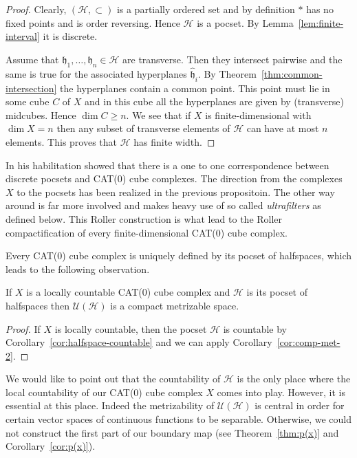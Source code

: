 \begin{proof}
  Clearly, \((\mathcal{H}, \subset)\) is a partially ordered set and by definition \(\ast\) has no fixed points and is order reversing. Hence \(\mathcal{H}\) is a pocset. By Lemma~\ref{lem:finite-interval} it is discrete.

  Assume that \(\mathfrak{h}_1, \dots, \mathfrak{h}_n \in \mathcal{H}\) are transverse. Then they intersect pairwise and the same is true for the associated hyperplanes \(\mathfrak{\hat h}_i\). By Theorem~\ref{thm:common-intersection} the hyperplanes contain a common point. This point must lie in some cube \(C\) of \(X\) and in this cube all the hyperplanes are given by (transverse) midcubes. Hence \(\dim C \geq n\). We see that if \(X\) is finite-dimensional with \(\dim X = n\) then any subset of transverse elements of \(\mathcal{H}\) can have at most \(n\) elements. This proves that \(\mathcal{H}\) has finite width.
\end{proof}

\begin{rem}
  \label{rem:roller}
  In his habilitation \textcite{Roller1999} showed that there is a one to one correspondence between discrete pocsets and CAT(0) cube complexes. The direction from the complexes \(X\) to the pocsets has been realized in the previous propositoin. The other way around is far more involved and makes heavy use of so called \emph{ultrafilters} as defined below. This Roller construction is what lead to the Roller compactification of every finite-dimensional CAT(0) cube complex.

  Every CAT(0) cube complex is uniquely defined by its pocset of halfspaces, which leads to the following observation.
\end{rem}

\begin{cor}
  \label{cor:comp-met}
  If \(X\) is a locally countable CAT(0) cube complex and \(\mathcal{H}\) is its pocset of halfspaces then \(\mathcal{U}(\mathcal{H})\) is a compact metrizable space.
\end{cor}

\begin{proof}
  If \(X\) is locally countable, then the pocset \(\mathcal{H}\) is countable by Corollary~\ref{cor:halfspace-countable} and we can apply Corollary~\ref{cor:comp-met-2}.
\end{proof}

\begin{rem}
  We would like to point out that the countability of \(\mathcal{H}\) is the only place where the local countability of our CAT(0) cube complex \(X\) comes into play. However, it is essential at this place. Indeed the metrizability of \(\mathcal{U}(\mathcal{H})\) is central in order for certain vector spaces of continuous functions to be separable. Otherwise, we could not construct the first part of our boundary map (see Theorem~\ref{thm:p(x)} and Corollary~\ref{cor:p(x)}).
\end{rem}

